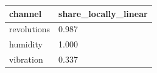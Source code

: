 \begin{tabular}{ll}
\toprule
channel & share\_locally\_linear \\
\midrule
revolutions & 0.987 \\
humidity & 1.000 \\
vibration & 0.337 \\
\bottomrule
\end{tabular}
